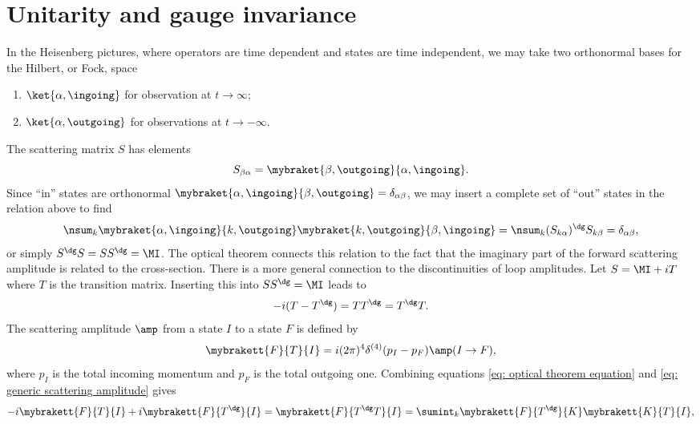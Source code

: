 \chapter{Unitarity and gauge invariance}
In the Heisenberg pictures, where operators are time dependent and states are time independent, we may take two orthonormal bases for the Hilbert, or Fock, space 
\begin{enumerate}
    \item $\ket{\alpha,\ingoing}$ for observation at $t \to \infty$;
    \item $\ket{\alpha,\outgoing}$ for observations at $t \to -\infty$.
\end{enumerate}
The scattering matrix $S$ has elements 
\begin{equation}
    S_{\beta\alpha} = \mybraket{\beta,\outgoing}{\alpha,\ingoing}.
\end{equation}
Since ``in'' states are orthonormal $\mybraket{\alpha,\ingoing}{\beta,\outgoing} = \delta_{\alpha\beta}$, we may insert a complete set of ``out'' states in the relation above to find
\begin{equation}
    \nsum_k\mybraket{\alpha,\ingoing}{k,\outgoing}\mybraket{k,\outgoing}{\beta,\ingoing} = \nsum_k(S_{k\alpha})^\dg S_{k\beta} = \delta_{\alpha\beta},
\end{equation}
or simply $S^\dg S = SS^\dg = \MI$. The optical theorem connects this relation to the fact that the imaginary part of the forward scattering amplitude is related to the cross-section. There is a more general connection to the discontinuities of loop amplitudes. Let $S = \MI + iT$ where $T$ is the transition matrix. Inserting this into $SS^\dg = \MI$ leads to 
\begin{equation}
\label{eq: optical theorem equation}
    -i(T - T^\dg) = TT^\dg = T^\dg T.
\end{equation}
The scattering amplitude $\amp$ from a state $I$ to a state $F$ is defined by
\begin{equation}
\label{eq: generic scattering amplitude}
    \mybrakett{F}{T}{I} = i(2\pi)^4\delta^{(4)}(p_I - p_F)\amp(I \to F),
\end{equation}
where $p_I$ is the total incoming momentum and $p_F$ is the total outgoing one. Combining equations \eqref{eq: optical theorem equation} and \eqref{eq: generic scattering amplitude} gives
\begin{equation}
    -i\mybrakett{F}{T}{I} + i\mybrakett{F}{T^\dg}{I} = \mybrakett{F}{T^\dg T}{I} = \sumint_k \mybrakett{F}{T^\dg}{K}\mybrakett{K}{T}{I},
\end{equation}
